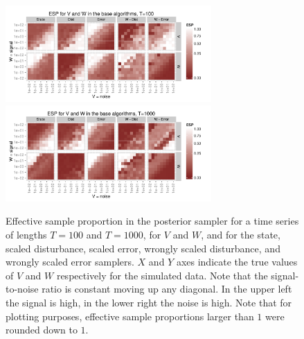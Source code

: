 \documentclass{article}
\begin{document}
\begin{figure}[!ht]
\centering
\includegraphics[width=0.7\textwidth]{plots/baseESplot1}
\includegraphics[width=0.7\textwidth]{plots/baseESplot2}
\caption{Effective sample proportion in the posterior sampler for a time series of lengths $T=100$ and $T=1000$, for $V$ and $W$, and for the state, scaled disturbance, scaled error, wrongly scaled disturbance, and wrongly scaled error samplers. $X$ and $Y$ axes indicate the true values of $V$ and $W$ respectively for the simulated data. Note that the signal-to-noise ratio is constant moving up any diagonal. In the upper left the signal is high, in the lower right the noise is high. Note that for plotting purposes, effective sample proportions larger than $1$ were rounded down to $1$.}
\label{baseESplot}
\end{figure}
\end{document}
